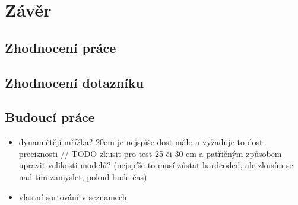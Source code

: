 
\chapter{Závěr}


\section{Zhodnocení práce}

\section{Zhodnocení dotazníku}

\section{Budoucí práce}


\begin{itemize}
	\item dynamičtějí mřížka? 20cm je nejspíše dost málo a vyžaduje to dost preciznosti // TODO zkusit pro test 25 či 30 cm a patřičným způsobem upravit velikosti modelů? (nejspíše to musí zůstat hardcoded, ale zkusím se nad tím zamyslet, pokud bude čas)
	\item vlastní sortování v seznamech

\end{itemize}

